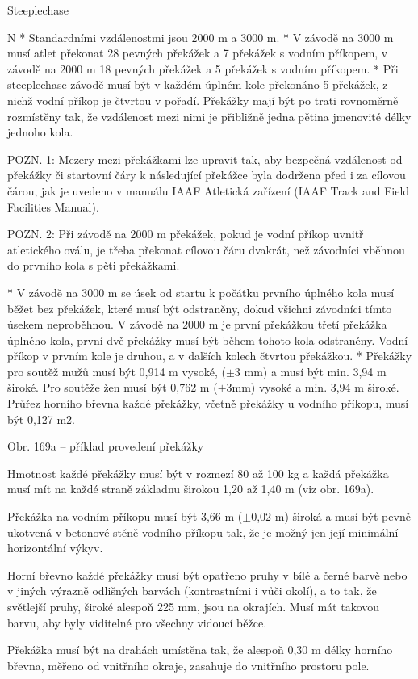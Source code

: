 \secc Steeplechase

\begitems \style N
* Standardními vzdálenostmi jsou 2000 m a 3000 m.
* V závodě na 3000 m musí atlet překonat 28 pevných překážek a 7 překážek s vodním příkopem, v závodě na 2000 m 18 pevných překážek a 5 překážek s vodním příkopem.
* Při steeplechase závodě musí být v každém úplném kole překonáno 5 překážek, z nichž vodní příkop je čtvrtou v pořadí. Překážky mají být po trati rovnoměrně rozmístěny tak, že vzdálenost mezi nimi je přibližně jedna pětina jmenovité délky jednoho kola.

POZN. 1: Mezery mezi překážkami lze upravit tak, aby bezpečná vzdálenost od překážky či startovní čáry k následující překážce byla dodržena před i za cílovou čárou, jak je uvedeno v manuálu IAAF Atletická zařízení (IAAF Track and Field Facilities Manual).

POZN. 2: Při závodě na 2000 m překážek, pokud je vodní příkop uvnitř atletického oválu, je třeba překonat cílovou čáru dvakrát, než závodníci vběhnou do prvního kola s pěti překážkami.

* V závodě na 3000 m se úsek od startu k počátku prvního úplného kola musí běžet bez překážek, které musí být odstraněny, dokud všichni závodníci tímto úsekem neproběhnou. V závodě na 2000 m je první překážkou třetí překážka úplného kola, první dvě překážky musí být během tohoto kola odstraněny. Vodní příkop v prvním kole je druhou, a v dalších kolech čtvrtou překážkou.
* Překážky pro soutěž mužů musí být 0,914 m vysoké, ($\pm$3 mm) a musí být min. 3,94 m široké. Pro soutěže žen musí být 0,762 m ($\pm$3mm) vysoké a min. 3,94 m široké. Průřez horního břevna každé překážky, včetně překážky u vodního příkopu, musí být 0,127 m2.


Obr. 169a -- příklad provedení překážky

Hmotnost každé překážky musí být v rozmezí 80 až 100 kg a každá překážka musí mít na každé straně základnu širokou 1,20 až 1,40 m (viz obr. 169a).

Překážka na vodním příkopu musí být 3,66 m ($\pm$0,02 m) široká a musí být pevně ukotvená v betonové stěně vodního příkopu tak, že je možný jen její minimální horizontální výkyv.

Horní břevno každé překážky musí být opatřeno pruhy v bílé a černé barvě nebo v jiných výrazně odlišných barvách (kontrastními i vůči okolí), a to tak, že světlejší pruhy, široké alespoň 225 mm, jsou na okrajích. Musí mát takovou barvu, aby byly viditelné pro všechny vidoucí běžce.

Překážka musí být na drahách umístěna tak, že alespoň 0,30 m délky horního břevna, měřeno od vnitřního okraje, zasahuje do vnitřního prostoru pole.

